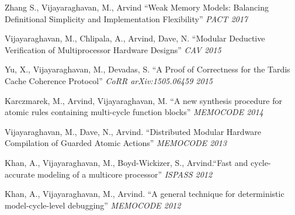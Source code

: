 \documentclass[margin,line]{resume}
\begin{document}
\begin{resume}
    \vspace{-2mm}
    Zhang S., {Vijayaraghavan, M.}, Arvind ``Weak Memory Models: Balancing Definitional Simplicity and Implementation Flexibility'' \textit{PACT 2017}

    \vspace{-2mm}
    {Vijayaraghavan, M.}, Chlipala, A., Arvind, Dave, N.
    ``Modular Deductive Verification of Multiprocessor Hardware Designs'' \textit{CAV 2015}

    \vspace{-2mm}
    Yu, X., {Vijayaraghavan, M.}, Devadas, S.
    ``A Proof of Correctness for the Tardis Cache Coherence Protocol'' \textit{CoRR arXiv:1505.06459 2015}

    \vspace{-2mm}
    Karczmarek, M., Arvind, {Vijayaraghavan, M.}
    ``A new synthesis procedure for atomic rules containing multi-cycle function blocks'' \textit{MEMOCODE 2014}

    \vspace{-2mm}
    {Vijayaraghavan, M.}, Dave, N., Arvind.
    ``Distributed Modular Hardware Compilation of Guarded Atomic Actions'' \textit{MEMOCODE 2013}

    \vspace{-2mm}
    Khan, A., {Vijayaraghavan, M.}, Boyd-Wickizer, S., Arvind.``Fast and cycle-accurate modeling of 
    a multicore processor''
    \textit {ISPASS 2012}

    \vspace{-2mm}
    Khan, A., {Vijayaraghavan, M.}, Arvind. ``A general technique for deterministic model-cycle-level debugging''
    \textit{MEMOCODE 2012}


\end{resume}
\end{document}
